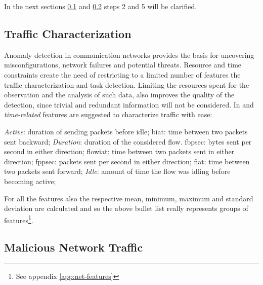 \noindent In the next sections \ref{subsec:traffic-characterization} and \ref{subsec:malicious-traffic} steps 2 and 5 will be clarified.



\subsection{Traffic Characterization}
\label{subsec:traffic-characterization}

Anomaly detection in communication networks provides the basis for uncovering misconfigurations, network failures and potential threats. Resource and time constraints create the need of restricting to a limited number of features the traffic characterization and task detection. Limiting the resources spent for the observation and the analysis of such data, also improves the quality of the detection, since trivial and redundant information will not be considered. In \cite{icissp17} and \cite{icissp18} \textit{time-related} features are suggested to characterize traffic with ease:
\begin{itemize}
    \itemAR \textit{Active}: duration of sending packets before idle;
    \itemAR \gls{biat}: time between two packets sent backward;
    \itemAR \textit{Duration}: duration of the considered flow.
    \itemAR \gls{fbpsec}: bytes sent per second in either direction;
    \itemAR \gls{flowiat}: time between two packets sent in either direction; 
    \itemAR \gls{fppsec}: packets sent per second in either direction;
    \itemAR \gls{fiat}: time between two packets sent forward; 
    \itemAR \textit{Idle}: amount of time the flow was idling before becoming active;
\end{itemize}
For all the features also the respective mean, minimum, maximum and standard deviation are calculated and so the above bullet list really represents groups of features\footnote{See appendix \ref{app:net-features}}.


\subsection{Malicious Network Traffic}
\label{subsec:malicious-traffic}

